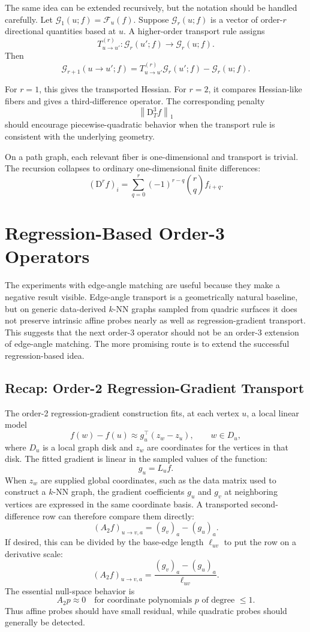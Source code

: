 \documentclass[11pt]{article}
\newcommand{\F}{\mathcal F}
\newcommand{\D}{\mathrm D}
\newcommand{\norm}[1]{\left\lVert #1 \right\rVert}
\begin{document}
The same idea can be extended recursively, but the notation should be handled
carefully.  Let \(\mathcal G_1(u;f)=\F_u(f)\).  Suppose
\(\mathcal G_r(u;f)\) is a vector of order-\(r\) directional quantities based
at \(u\).  A higher-order transport rule assigns
\[
  T^{(r)}_{u\to u'}:
  \mathcal G_r(u';f)\to \mathcal G_r(u;f).
\]
Then
\[
  \mathcal G_{r+1}(u\to u';f)
  =
  T^{(r)}_{u\to u'}\mathcal G_r(u';f)
  -
  \mathcal G_r(u;f).
\]

For \(r=1\), this gives the transported Hessian.  For \(r=2\), it compares
Hessian-like fibers and gives a third-difference operator.  The corresponding
penalty
\[
  \norm{\D_T^3 f}_1
\]
should encourage piecewise-quadratic behavior when the transport rule is
consistent with the underlying geometry.

On a path graph, each relevant fiber is one-dimensional and transport is
trivial.  The recursion collapses to ordinary one-dimensional finite
differences:
\[
  (\D^r f)_i
  =
  \sum_{q=0}^{r}
  (-1)^{r-q}\binom rq f_{i+q}.
\]

\section{Regression-Based Order-3 Operators}

The experiments with edge-angle matching are useful because they make a
negative result visible.  Edge-angle transport is a geometrically natural
baseline, but on generic data-derived \(k\)-NN graphs sampled from quadric
surfaces it does not preserve intrinsic affine probes nearly as well as
regression-gradient transport.  This suggests that the next order-3 operator
should not be an order-3 extension of edge-angle matching.  The more promising
route is to extend the successful regression-based idea.

\subsection{Recap: Order-2 Regression-Gradient Transport}

The order-2 regression-gradient construction fits, at each vertex \(u\), a
local linear model
\[
  f(w)-f(u)
  \approx
  g_u^\top(z_w-z_u),
  \qquad w\in D_u,
\]
where \(D_u\) is a local graph disk and \(z_w\) are coordinates for the
vertices in that disk.  The fitted gradient is linear in the sampled values of
the function:
\[
  g_u = L_u f.
\]
When \(z_w\) are supplied global coordinates, such as the data matrix used to
construct a \(k\)-NN graph, the gradient coefficients \(g_u\) and \(g_v\) at
neighboring vertices are expressed in the same coordinate basis.  A transported
second-difference row can therefore compare them directly:
\[
  (A_2 f)_{u\to v,a}
  =
  (g_v)_a-(g_u)_a.
\]
If desired, this can be divided by the base-edge length \(\ell_{uv}\) to put
the row on a derivative scale:
\[
  (A_2 f)_{u\to v,a}
  =
  \frac{(g_v)_a-(g_u)_a}{\ell_{uv}}.
\]
The essential null-space behavior is
\[
  A_2 p \approx 0
  \quad\text{for coordinate polynomials }p\text{ of degree }\le 1.
\]
Thus affine probes should have small residual, while quadratic probes should
generally be detected.
\end{document}
